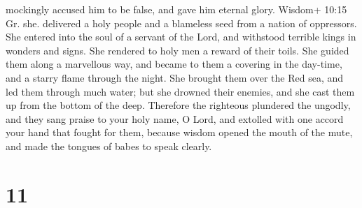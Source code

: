 mockingly accused him to be false, and gave him eternal glory.
 Wisdom+ 10:15 Gr. she. delivered a holy people and a
blameless seed from a nation of oppressors.  She entered
into the soul of a servant of the Lord, and withstood terrible kings in
wonders and signs.  She rendered to holy men a reward of
their toils. She guided them along a marvellous way, and became to them
a covering in the day-time, and a starry flame through the night.
 She brought them over the Red sea, and led them through
much water;  but she drowned their enemies, and she cast
them up from the bottom of the deep.  Therefore the
righteous plundered the ungodly, and they sang praise to your holy name,
O Lord, and extolled with one accord your hand that fought for them,
 because wisdom opened the mouth of the mute, and made the
tongues of babes to speak clearly.

\hypertarget{section-10}{%
\section{11}\label{section-10}}

